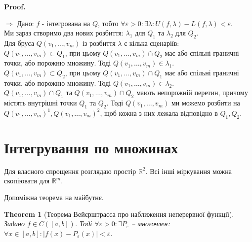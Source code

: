 \documentclass[a4paper, 10pt]{article}
\makeatletter
\def\qed{$\blacksquare$}
\def\rightproof{$\boxed{\Rightarrow}$ }
\theoremstyle{theoremdd}
\newtheorem{theorem}{Theorem}[subsection]
\theoremstyle{theoremdd}
\theoremstyle{theoremdd}
\theoremstyle{theoremdd}
\theoremstyle{theoremdd}
\theoremstyle{theoremdd}
\theoremstyle{theoremdd}
\theoremstyle{theoremdd}
\theoremstyle{theoremdd}
\theoremstyle{theoremdd}
\theoremstyle{theoremdd}
\theoremstyle{theoremdd}
\theoremstyle{theoremdd}
\theoremstyle{theoremdd}
\theoremstyle{theoremdd}
\renewenvironment{proof}[1][Proof.\\]{\par
\pushQED{\hfill \qed}%
\normalfont \topsep6\p@\@plus6\p@\relax
\trivlist
\item\relax
{\bfseries
#1\@addpunct{.}}\hspace\labelsep\ignorespaces
}{%
\popQED\endtrivlist\@endpefalse
}
\makeatother
\begin{document}
\begin{proof}
\rightproof Дано: $f$ - інтегрована на $Q$, тобто $\forall \varepsilon > 0: \exists \lambda: U(f,\lambda) - L(f,\lambda) < \varepsilon$.\\
Ми зараз створимо два нових розбиття: $\lambda_1$ для $Q_1$ та $\lambda_2$ для $Q_2$.\\
Для бруса $Q(v_1,\dots,v_m)$ із розбиття $\lambda$ є кілька сценаріїв:\\
$Q(v_1,\dots,v_m) \subset Q_1$, при цьому $Q(v_1,\dots,v_m) \cap Q_2$ має або спільні граничні точки, або порожню множину. Тоді $Q(v_1,\dots,v_m) \in \lambda_1$.\\
$Q(v_1,\dots,v_m) \subset Q_2$, при цьому $Q(v_1,\dots,v_m) \cap Q_1$ має або спільні граничні точки, або порожню множину. Тоді $Q(v_1,\dots,v_m) \in \lambda_2$.\\
$Q(v_1,\dots,v_m) \cap Q_1$ та $Q(v_1,\dots,v_m) \cap Q_2$ мають непорожній перетин, причому містять внутрішні точки $Q_1$ та $Q_2$. Тоді $Q(v_1,\dots,v_m)$ ми можемо розбити на $Q(v_1,\dots,v_m)^1, Q(v_1,\dots,v_m)^2$, щоб кожна з них лежала відповідно в $Q_1,Q_2$.
\end{proof}
\fi

\newpage

\section{Інтегрування по множинах}
Для власного спрощення розглядаю простір $\mathbb{R}^2$. Всі інші міркування можна скопіювати для $\mathbb{R}^m$.

Допоміжна теорема на майбутнє.
\begin{theorem}[Теорема Вейєрштрасса про наближення неперервної функції]
Задано $f \in C([a,b])$. Тоді $\forall \varepsilon > 0: \exists P_\varepsilon$ -- многочлен: $\forall x \in [a,b]: |f(x) - P_\varepsilon(x)| < \varepsilon$.
\end{theorem}
\end{document}
